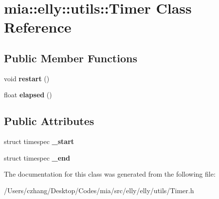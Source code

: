 \hypertarget{classmia_1_1elly_1_1utils_1_1_timer}{\section{mia\-:\-:elly\-:\-:utils\-:\-:Timer Class Reference}
\label{classmia_1_1elly_1_1utils_1_1_timer}
}
\subsection*{Public Member Functions}
\begin{DoxyCompactItemize}
\item 
\hypertarget{classmia_1_1elly_1_1utils_1_1_timer_ab1d1c1ad1f3a3931f9e83917494d4417}{void {\bfseries restart} ()}\label{classmia_1_1elly_1_1utils_1_1_timer_ab1d1c1ad1f3a3931f9e83917494d4417}

\item 
\hypertarget{classmia_1_1elly_1_1utils_1_1_timer_adbdb379b3e084eb86b88e5edaaefc27c}{float {\bfseries elapsed} ()}\label{classmia_1_1elly_1_1utils_1_1_timer_adbdb379b3e084eb86b88e5edaaefc27c}

\end{DoxyCompactItemize}
\subsection*{Public Attributes}
\begin{DoxyCompactItemize}
\item 
\hypertarget{classmia_1_1elly_1_1utils_1_1_timer_a2719cf47fab1edb158bf7a7424fed6af}{struct timespec {\bfseries \-\_\-start}}\label{classmia_1_1elly_1_1utils_1_1_timer_a2719cf47fab1edb158bf7a7424fed6af}

\item 
\hypertarget{classmia_1_1elly_1_1utils_1_1_timer_a04fc3f2bb34cc79d9761e23f4118d590}{struct timespec {\bfseries \-\_\-end}}\label{classmia_1_1elly_1_1utils_1_1_timer_a04fc3f2bb34cc79d9761e23f4118d590}

\end{DoxyCompactItemize}


The documentation for this class was generated from the following file\-:\begin{DoxyCompactItemize}
\item 
/\-Users/czhang/\-Desktop/\-Codes/mia/src/elly/elly/utils/Timer.\-h\end{DoxyCompactItemize}
